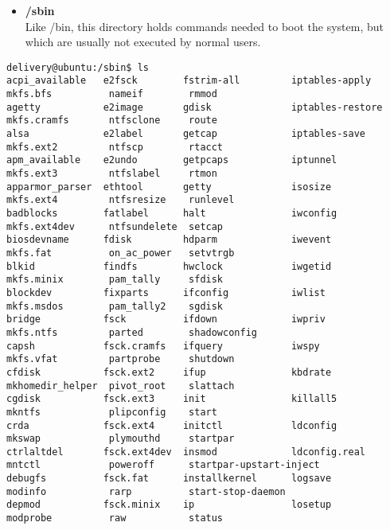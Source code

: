 \documentclass[a4paper,11pt,spanish]{article} %
\newenvironment{mytinylisting}
{\begin{list}{}{\setlength{\leftmargin}{1em}}\item\tiny\bfseries}
{\end{list}}
\begin{document}
\begin{itemize}

\item \textbf{/sbin}\\
    Like /bin, this directory holds commands needed to boot the 
    system, but which are usually not executed by normal users.
\end{itemize}

\begin{mytinylisting}
 \begin{verbatim}
delivery@ubuntu:/sbin$ ls
acpi_available   e2fsck        fstrim-all         iptables-apply    mkfs.bfs          nameif        rmmod                    
agetty           e2image       gdisk              iptables-restore  mkfs.cramfs       ntfsclone     route                    
alsa             e2label       getcap             iptables-save     mkfs.ext2         ntfscp        rtacct                   
apm_available    e2undo        getpcaps           iptunnel          mkfs.ext3         ntfslabel     rtmon                    
apparmor_parser  ethtool       getty              isosize           mkfs.ext4         ntfsresize    runlevel                 
badblocks        fatlabel      halt               iwconfig          mkfs.ext4dev      ntfsundelete  setcap                   
biosdevname      fdisk         hdparm             iwevent           mkfs.fat          on_ac_power   setvtrgb                 
blkid            findfs        hwclock            iwgetid           mkfs.minix        pam_tally     sfdisk                   
blockdev         fixparts      ifconfig           iwlist            mkfs.msdos        pam_tally2    sgdisk                   
bridge           fsck          ifdown             iwpriv            mkfs.ntfs         parted        shadowconfig             
capsh            fsck.cramfs   ifquery            iwspy             mkfs.vfat         partprobe     shutdown                 
cfdisk           fsck.ext2     ifup               kbdrate           mkhomedir_helper  pivot_root    slattach                 
cgdisk           fsck.ext3     init               killall5          mkntfs            plipconfig    start                    
crda             fsck.ext4     initctl            ldconfig          mkswap            plymouthd     startpar                 
ctrlaltdel       fsck.ext4dev  insmod             ldconfig.real     mntctl            poweroff      startpar-upstart-inject  
debugfs          fsck.fat      installkernel      logsave           modinfo           rarp          start-stop-daemon        
depmod           fsck.minix    ip                 losetup           modprobe          raw           status                   

\end{verbatim}
\end{mytinylisting}
\end{document}
